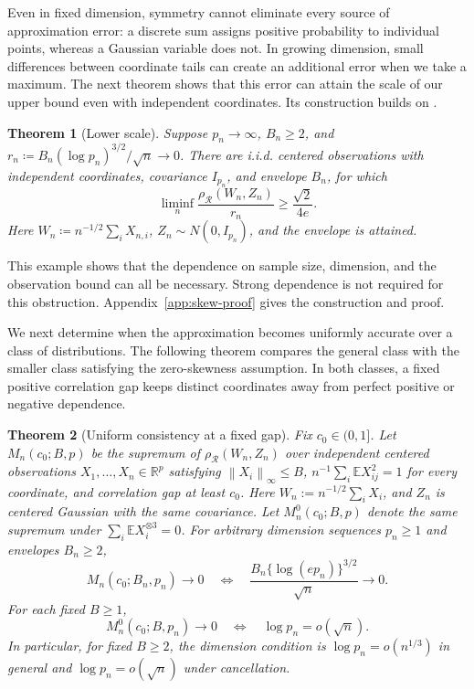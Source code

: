 \documentclass[11pt,letterpaper]{article}
\newtheorem{theorem}{Theorem}
\theoremstyle{remark}
\newcommand{\E}{\mathbb E}
\newcommand{\R}{\mathbb R}
\newcommand{\norm}[1]{\left\lVert#1\right\rVert}
\newcommand{\rh}{\rho_{\mathcal R}}
\begin{document}
Even in fixed dimension, symmetry cannot eliminate every source of
approximation error: a discrete sum assigns positive probability to
individual points, whereas a Gaussian variable does not. In growing
dimension, small differences between coordinate tails can create an
additional error when we take a maximum. The next theorem shows that
this error can attain the scale of our upper bound even with independent
coordinates. Its construction builds on
\cite[Proposition~2.1]{CCK}.
\begin{samepage}
\begin{theorem}[Lower scale]\label{opt:skew-lower}
Suppose \(p_n\to\infty\), \(B_n\ge2\), and
\(r_n\coloneqq B_n(\log p_n)^{3/2}/\sqrt n\to0\). There are i.i.d.
centered observations with independent coordinates, covariance
\(I_{p_n}\), and envelope \(B_n\), for which
\begin{equation}
 \liminf_n\frac{\rh(W_n,Z_n)}{r_n}\ge\frac{\sqrt2}{4e}.
 \label{opt:lower-constant}
\end{equation}
Here \(W_n\coloneqq n^{-1/2}\sum_iX_{n,i}\),
\(Z_n\sim N(0,I_{p_n})\), and the envelope is attained.
\end{theorem}
\end{samepage}

This example shows that the dependence on sample size, dimension, and
the observation bound can all be necessary. Strong dependence is not
required for this obstruction. Appendix~\ref{app:skew-proof} gives the
construction and proof.

We next determine when the approximation becomes uniformly accurate
over a class of distributions. The following theorem compares the
general class with the smaller class satisfying the zero-skewness
assumption. In both classes, a fixed positive correlation gap keeps
distinct coordinates away from perfect positive or negative dependence.
\begin{theorem}[Uniform consistency at a fixed gap]
\label{opt:consistency}
Fix \(c_0\in(0,1]\). Let \(M_n(c_0;B,p)\) be the supremum of
\(\rh(W_n,Z_n)\) over independent centered observations
\(X_1,\ldots,X_n\in\R^p\) satisfying
\(\norm{X_i}_\infty\le B\),
\(n^{-1}\sum_i\E X_{ij}^2=1\) for every coordinate, and correlation
gap at least \(c_0\). Here \(W_n:=n^{-1/2}\sum_iX_i\), and \(Z_n\)
is centered Gaussian with the same covariance. Let \(M_n^0(c_0;B,p)\)
denote the same supremum under \(\sum_i\E X_i^{\otimes3}=0\).
For arbitrary dimension sequences \(p_n\ge1\) and envelopes \(B_n\ge2\),
\begin{equation}
 M_n(c_0;B_n,p_n)\longrightarrow0
 \quad\Longleftrightarrow\quad
 \frac{B_n\{\log(ep_n)\}^{3/2}}{\sqrt n}\longrightarrow0.
 \label{opt:consistency-iff}
\end{equation}
For each fixed \(B\ge1\),
\[
 M_n^0(c_0;B,p_n)\longrightarrow0
 \quad\Longleftrightarrow\quad \log p_n=o(\sqrt n).
\]
In particular, for fixed \(B\ge2\), the dimension condition is
\(\log p_n=o(n^{1/3})\) in general and
\(\log p_n=o(\sqrt n)\) under cancellation.
\end{theorem}
\end{document}
